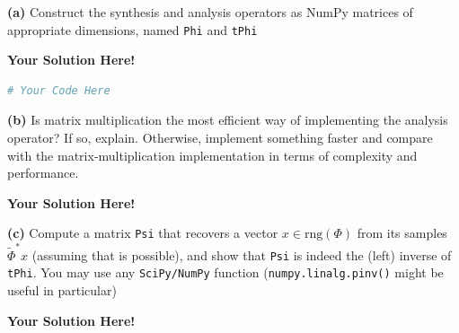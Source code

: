 \documentclass[12pt]{article}
\newcommand{\0}{\mathbf{0}}
\newcommand{\1}{\mathbf{1}}
\newcommand{\range}{\text{rng}}
\newcommand{\solspace}{\vspace{3mm} \textbf{Your Solution Here!} \vspace{3mm}}
\begin{document}
\textbf{(a)} Construct the synthesis and analysis operators as NumPy matrices of appropriate dimensions, named \verb|Phi| and \verb|tPhi|

\solspace

\begin{lstlisting}[language=Python]
# Your Code Here
\end{lstlisting}

\textbf{(b)} Is matrix multiplication the most efficient way of implementing the analysis operator? If so, explain. Otherwise, implement something faster and compare with the matrix-multiplication implementation in terms of complexity and performance.

\solspace

\textbf{(c)} Compute a matrix \verb|Psi| that recovers a vector $x \in \range(\Phi)$ from its samples $\tilde \Phi^* x$ (assuming that is possible), and show that \verb|Psi| is indeed the (left) inverse of \verb|tPhi|. You may use any \verb|SciPy/NumPy| function (\verb|numpy.linalg.pinv()| might be useful in particular)

\solspace

\pagebreak
\end{document}
